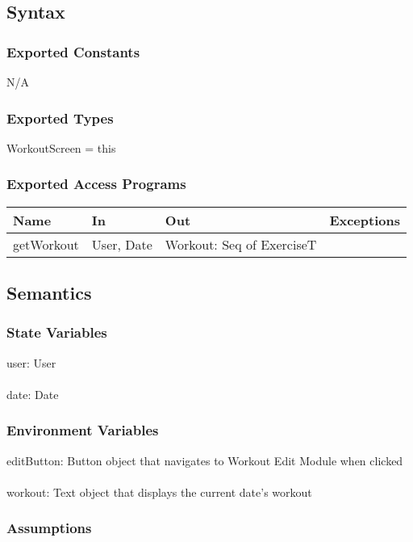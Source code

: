 \documentclass[12pt, titlepage]{article}
\begin{document}
\subsection{Syntax}

\subsubsection{Exported Constants}
N/A

\subsubsection{Exported Types}
WorkoutScreen = this

\subsubsection{Exported Access Programs}

\begin{tabular}{| l | l | l | l |}
	\hline
	{\textbf{Name}} & {\textbf{In}} & {\textbf{Out}} & {\textbf{Exceptions}}\\
	\hline
	{getWorkout} & User, Date & Workout: Seq of ExerciseT & \\
	\hline
\end{tabular}

\subsection{Semantics}

\subsubsection{State Variables}

user: User\\\\
date: Date

\subsubsection{Environment Variables}

editButton: Button object that navigates to Workout Edit Module when clicked\\\\
workout: Text object that displays the current date's workout

\subsubsection{Assumptions}
\end{document}
